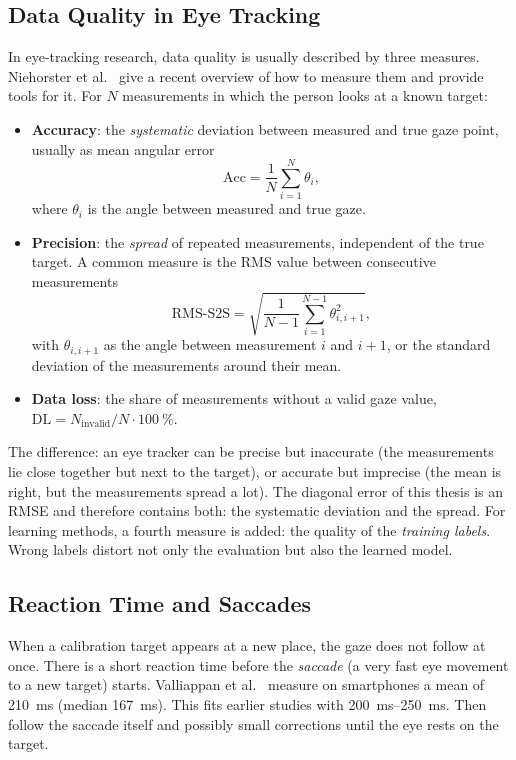 \subsection{Data Quality in Eye Tracking}
\label{subsec:datenqualitaet}
In eye-tracking research, data quality is usually described by three measures.
Niehorster et al.~\cite{niehorster2026quality} give a recent overview of how to
measure them and provide tools for it. For $N$ measurements in which the person
looks at a known target:
\begin{itemize}
  \item \textbf{Accuracy}: the \emph{systematic} deviation between measured
        and true gaze point, usually as mean angular error
        \[
          \mathrm{Acc} = \frac{1}{N}\sum_{i=1}^{N} \theta_i ,
        \]
        where $\theta_i$ is the angle between measured and true gaze.
  \item \textbf{Precision}: the \emph{spread} of repeated measurements,
        independent of the true target. A common measure is the RMS value
        between consecutive measurements
        \[
          \mathrm{RMS\text{-}S2S} = \sqrt{\frac{1}{N-1}\sum_{i=1}^{N-1} \theta_{i,i+1}^{2}} ,
        \]
        with $\theta_{i,i+1}$ as the angle between measurement $i$ and $i+1$,
        or the standard deviation of the measurements around their mean.
  \item \textbf{Data loss}: the share of measurements without a valid gaze
        value, $\mathrm{DL} = N_{\text{invalid}} / N \cdot \SI{100}{\percent}$.
\end{itemize}
The difference: an eye tracker can be precise but inaccurate (the measurements
lie close together but next to the target), or accurate but imprecise (the
mean is right, but the measurements spread a lot). The diagonal error of this
thesis is an RMSE and therefore contains both: the systematic deviation and the
spread. For learning methods, a
fourth measure is added: the quality of the \emph{training labels}. Wrong
labels distort not only the evaluation but also the learned model.

\subsection{Reaction Time and Saccades}
\label{subsec:latenz}
When a calibration target appears at a new place, the gaze does not follow at
once. There is a short reaction time before the \emph{saccade} (a very fast eye
movement to a new target) starts.
Valliappan et al.~\cite{valliappan2020smartphone} measure on smartphones a mean
of \SI{210}{\milli\second} (median \SI{167}{\milli\second}). This fits earlier
studies with \SIrange{200}{250}{\milli\second}. Then follow the saccade itself
and possibly small corrections until the eye rests on the target.

